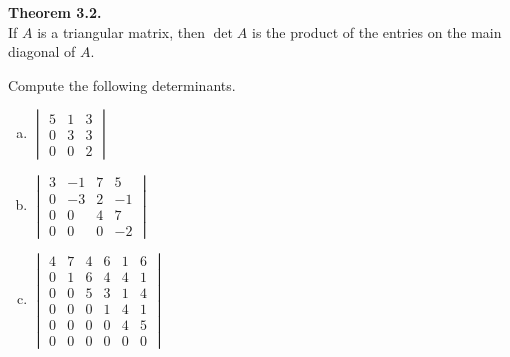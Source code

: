 \begin{boxthm}
	\textbf{Theorem 3.2.} \\
	If $A$ is a triangular matrix, then $\det A$ is the product of the entries on the main diagonal of $A$.
\end{boxthm}
\begin{exercise} %
	Compute the following determinants.
	\begin{multicols}{3}
	\begin{enumerate}[(a)]
		\item
			$\begin{vmatrix}
			5&1&3\\
			0&3&3\\
			0&0&2
			\end{vmatrix}$
		\item 
			$\begin{vmatrix}
			3&-1&7& 5\\
			0&-3&2&-1\\
			0& 0&4& 7\\
			0& 0&0&-2
			\end{vmatrix}$
		\item
			$\begin{vmatrix}
			4&7&4&6&1&6\\
			0&1&6&4&4&1\\
			0&0&5&3&1&4\\
			0&0&0&1&4&1\\
			0&0&0&0&4&5\\
			0&0&0&0&0&0
			\end{vmatrix}$
	\end{enumerate}
	\end{multicols}
\end{exercise}
\vspace{1in}

